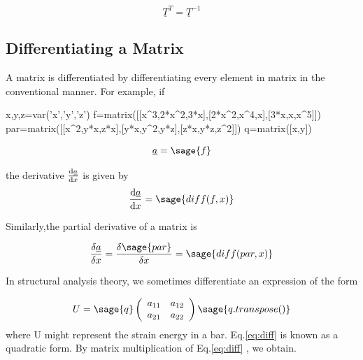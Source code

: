 \documentclass[12pt]{report}
\newcommand{\lab}[1]{
	Eq.\ref{#1}
}
\begin{document}
\begin{equation}
	\underline{T}^T=\underline{T}^{-1}
\end{equation}


\subsection{Differentiating a Matrix}

A matrix is differentiated by differentiating
 every element in matrix in the conventional 
manner. For example, if

\begin{sagesilent}
	x,y,z=var('x','y','z')
	f=matrix([[x^3,2*x^2,3*x],[2*x^2,x^4,x],[3*x,x,x^5]])
	par=matrix([[x^2,y*x,z*x],[y*x,y^2,y*z],[z*x,y*z,z^2]])
	q=matrix([x,y])
\end{sagesilent}

\begin{equation}
	\underline{a}= \sage{f}
\end{equation}

the derivative $\frac{{\rm d}\underline{a}}{{\rm d}x}$ 
is given by 
\begin{equation} 
	\frac{{\rm d}\underline{a}}{{\rm d}x} = \sage{diff(f,x)}
\end{equation}

Similarly,the partial derivative of a matrix is 

\begin{equation} 
	\frac{\delta\underline{a}}{\delta x}= \frac{\delta \sage{par} }{\delta x} = \sage{diff(par,x)} 
\end{equation}

In structural analysis theory, 
we sometimes differentiate an expression of the form 

\begin{equation}
	U =\sage{q}\left(\begin{array}{rr}a_{11} & a_{12}\\
	a_{21} & a_{22}\\ 
	\end{array}\right)\sage{q.transpose()}
\label{eq:diff}
\end{equation}
where U might represent the strain energy in 
a bar.\lab{eq:diff} is known as a quadratic 
form. By matrix multiplication of \lab{eq:diff}, 
we obtain.
\end{document}
